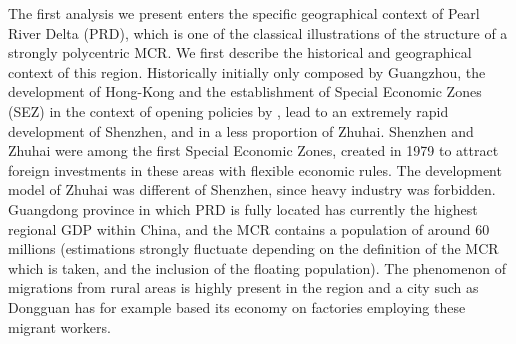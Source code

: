 The first analysis we present enters the specific geographical context of Pearl River Delta (PRD), which is one of the classical illustrations of the structure of a strongly polycentric MCR. We first describe the historical and geographical context of this region. Historically initially only composed by Guangzhou, the development of Hong-Kong and the establishment of Special Economic Zones (SEZ) in the context of opening policies by , lead to an extremely rapid development of Shenzhen, and in a less proportion of Zhuhai. Shenzhen and Zhuhai were among the first Special Economic Zones, created in 1979 to attract foreign investments in these areas with flexible economic rules. The development model of Zhuhai was different of Shenzhen, since heavy industry was forbidden. Guangdong province in which PRD is fully located has currently the highest regional GDP within China, and the MCR contains a population of around 60 millions (estimations strongly fluctuate depending on the definition of the MCR which is taken, and the inclusion of the floating population). The phenomenon of migrations from rural areas is highly present in the region and a city such as Dongguan has for example based its economy on factories employing these migrant workers.


